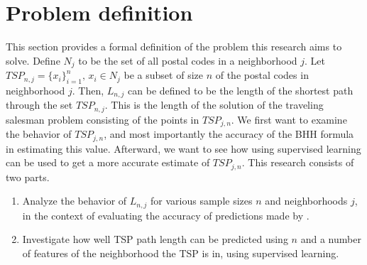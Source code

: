 \section{Problem definition}
This section provides a formal definition of the problem this research aims to solve.
Define $N_j$ to be the set of all postal codes in a neighborhood $j$.
Let $TSP_{n,j}=\{x_i\}_{i=1}^n,\,x_i\in N_j$ be a subset of size $n$ of the postal codes in neighborhood $j$.
Then, $L_{n,j}$ can be defined to be the length of the shortest path through the set $TSP_{n,j}$.
This is the length of the solution of the traveling salesman problem consisting of the points in $TSP_{j,n}$.
We first want to examine the behavior of $TSP_{j,n}$, and most importantly the accuracy of the BHH formula in estimating this value.
Afterward, we want to see how using supervised learning can be used to get a more accurate estimate of $TSP_{j,n}$.
This research consists of two parts.
\begin{enumerate}
	\item Analyze the behavior of \( L_{n,j} \) for various sample sizes \( n \) and neighborhoods \( j \),
	      in the context of evaluating the accuracy of predictions made by .
	\item Investigate how well TSP path length can be predicted using $n$ and a number of features of the neighborhood
	      the TSP is in, using supervised learning.
\end{enumerate}
